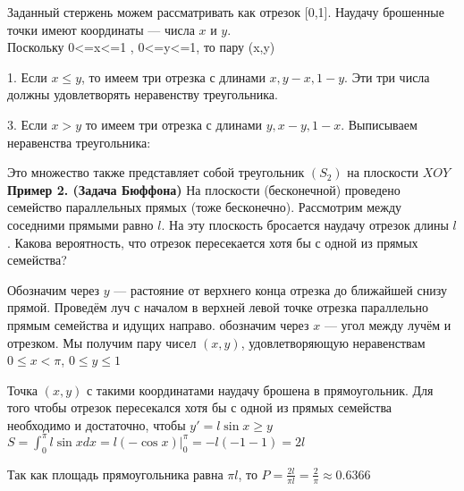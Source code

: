 \documentclass{article}
\begin{document}
    Заданный стержень можем рассматривать как отрезок [0,1]. Наудачу брошенные точки имеют координаты --- числа $x$ и $y$.\\
    Поскольку 0<=x<=1 , 0<=y<=1, то пару (x,y) 

    1. Если \textbf{$x \leq y$}, то имеем три отрезка с длинами \(x, y-x, 1-y\). Эти три числа должны удовлетворять неравенству треугольника.
    

    3. Если \textbf{$x > y$} то имеем три отрезка с длинами \(y, x-y, 1-x\). Выписываем неравенства треугольника:


    Это множество также представляет собой треугольник $(S_2)$ на плоскости $XOY$\\
    

    
    \textbf{Пример 2. (Задача Бюффона)} На плоскости (бесконечной) проведено семейство параллельных прямых (тоже бесконечно). Рассмотрим между соседними прямыми равно $l$. На эту плоскость бросается наудачу отрезок длины $l$. Какова вероятность, что отрезок пересекается хотя бы с одной из прямых семейства?   
    
    Обозначим через $y$ --- растояние от верхнего конца отрезка до ближайшей снизу прямой.
    Проведём луч с началом в верхней левой точке отрезка параллельно прямым семейства и идущих направо. обозначим через $x$ --- угол между лучём и отрезком.
    Мы получим пару чисел $(x, y)$, удовлетворяющую неравенствам \(0 \leq x < \pi\), \(0 \leq y \leq 1\)
    
    
    Точка $(x, y)$ с такими координатами наудачу брошена в прямоугольник. Для того чтобы отрезок пересекался хотя бы с одной из прямых семейства необходимо и достаточно, чтобы \(y' = l\sin x \geq y\)
    \( S = \int^{\pi}_0l\sin xdx = l(-\cos x)|^{\pi}_0 = -l(-1-1) = 2l\)

    
    Так как площадь прямоугольника равна $\pi l$, то \(P = \frac{2l}{\pi l} = \frac{2}{\pi} \approx 0.6366\)

    
    
\end{document}
